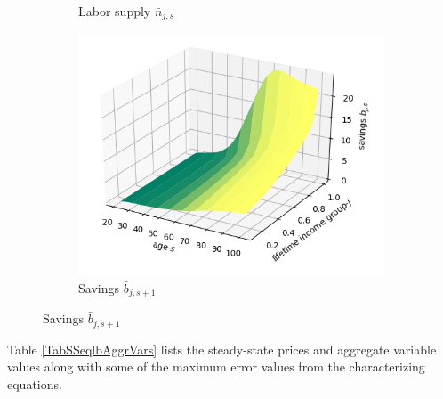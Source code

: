 \begin{figure}[htb]
\begin{subfigure}[b]{0.48\textwidth}
      \caption{Labor supply $\bar{n}_{j,s}$}
      \label{FigSSeqlbHHlab}
    \end{subfigure}
    \begin{subfigure}[b]{0.48\textwidth}
      \includegraphics[width=\textwidth]{images/HHsav_SS.png}
      \caption{Savings $\bar{b}_{j,s+1}$}
      \label{FigSSeqlbHHsav}
    \end{subfigure}
  \end{figure}

  Table \ref{TabSSeqlbAggrVars} lists the steady-state prices and aggregate variable values along with some of the maximum error values from the characterizing equations.


